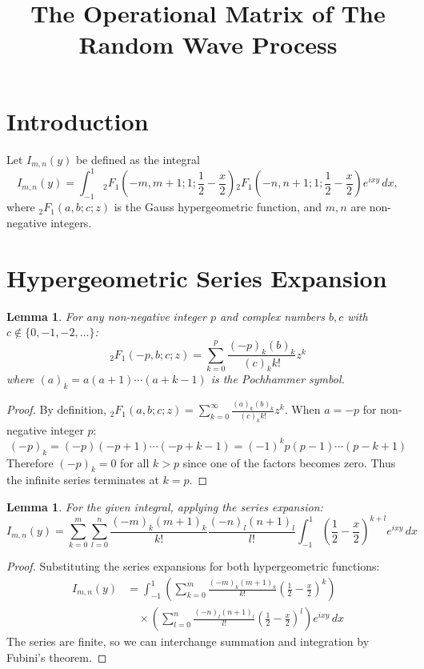 \documentclass[12pt]{article}
\newtheorem{lemma}[theorem]{Lemma}
\begin{document}
\title{The Operational Matrix of The Random Wave Process}
\author{}
\date{}
\maketitle

\section*{Introduction}

Let $I_{m,n}(y)$ be defined as the integral
\[
I_{m,n}(y) = \int_{-1}^1 {}_2F_1\left(-m, m+1; 1; \frac{1}{2} - \frac{x}{2}\right) 
{}_2F_1\left(-n, n+1; 1; \frac{1}{2} - \frac{x}{2}\right) e^{i x y} \, dx,
\]
where ${}_2F_1(a, b; c; z)$ is the Gauss hypergeometric function, and $m, n$ are non-negative integers.

\section*{Hypergeometric Series Expansion}

\begin{lemma}
For any non-negative integer $p$ and complex numbers $b,c$ with $c \notin \{0,-1,-2,\ldots\}$:
\[
{}_2F_1(-p, b; c; z) = \sum_{k=0}^p \frac{(-p)_k (b)_k}{(c)_k k!} z^k
\]
where $(a)_k = a(a+1)\cdots(a+k-1)$ is the Pochhammer symbol.
\end{lemma}

\begin{proof}
By definition, ${}_2F_1(a,b;c;z) = \sum_{k=0}^\infty \frac{(a)_k(b)_k}{(c)_k k!}z^k$. When $a=-p$ for non-negative integer $p$:
\[
(-p)_k = (-p)(-p+1)\cdots(-p+k-1) = (-1)^k p(p-1)\cdots(p-k+1)
\]
Therefore $(-p)_k = 0$ for all $k > p$ since one of the factors becomes zero. Thus the infinite series terminates at $k=p$.
\end{proof}

\begin{lemma}
For the given integral, applying the series expansion:
\[
I_{m,n}(y) = \sum_{k=0}^m \sum_{l=0}^n \frac{(-m)_k (m+1)_k}{k!} \frac{(-n)_l (n+1)_l}{l!} 
\int_{-1}^1 \left(\frac{1}{2} - \frac{x}{2}\right)^{k+l} e^{i x y} \, dx
\]
\end{lemma}

\begin{proof}
Substituting the series expansions for both hypergeometric functions:
\begin{align*}
I_{m,n}(y) &= \int_{-1}^1 \left(\sum_{k=0}^m \frac{(-m)_k (m+1)_k}{k!} \left(\frac{1}{2} - \frac{x}{2}\right)^k\right) \\
&\quad \times \left(\sum_{l=0}^n \frac{(-n)_l (n+1)_l}{l!} \left(\frac{1}{2} - \frac{x}{2}\right)^l\right) e^{ixy} \, dx
\end{align*}
The series are finite, so we can interchange summation and integration by Fubini's theorem.
\end{proof}
\end{document}
